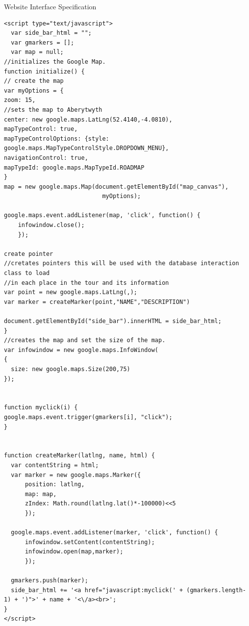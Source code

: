 \documentclass{article}
\begin{document}
\begin{section}{Website Interface Specification}
\begin{lstlisting}[caption=Google Maps API Javascript Example]
<script type="text/javascript"> 
  var side_bar_html = ""; 
  var gmarkers = []; 
  var map = null;
//initializes the Google Map.
function initialize() {
// create the map
var myOptions = {
zoom: 15,
//sets the map to Aberytwyth
center: new google.maps.LatLng(52.4140,-4.0810),
mapTypeControl: true,
mapTypeControlOptions: {style: google.maps.MapTypeControlStyle.DROPDOWN_MENU},
navigationControl: true,
mapTypeId: google.maps.MapTypeId.ROADMAP
}
map = new google.maps.Map(document.getElementById("map_canvas"),
                            myOptions);

google.maps.event.addListener(map, 'click', function() {
    infowindow.close();
    });

create pointer
//cretates pointers this will be used with the database interaction class to load 
//in each place in the tour and its information
var point = new google.maps.LatLng(,);
var marker = createMarker(point,"NAME","DESCRIPTION")

document.getElementById("side_bar").innerHTML = side_bar_html;
}
//creates the map and set the size of the map.
var infowindow = new google.maps.InfoWindow(
{ 
  size: new google.maps.Size(200,75)
});
  

function myclick(i) {
google.maps.event.trigger(gmarkers[i], "click");
}


function createMarker(latlng, name, html) {
  var contentString = html;
  var marker = new google.maps.Marker({
      position: latlng,
      map: map,
      zIndex: Math.round(latlng.lat()*-100000)<<5
      });

  google.maps.event.addListener(marker, 'click', function() {
      infowindow.setContent(contentString); 
      infowindow.open(map,marker);
      });
  
  gmarkers.push(marker);
  side_bar_html += '<a href="javascript:myclick(' + (gmarkers.length-1) + ')">' + name + '<\/a><br>';
}
</script>
\end{lstlisting}
\end{section}
\end{document}
